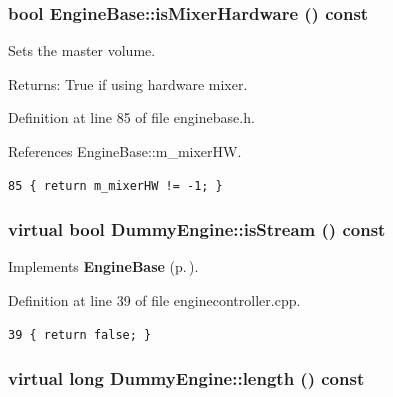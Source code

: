 \subsubsection{\setlength{\rightskip}{0pt plus 5cm}bool Engine\-Base::is\-Mixer\-Hardware () const\hspace{0.3cm}{\tt  [inline, inherited]}}\label{classEngineBase_EngineBasea11}


Sets the master volume. \begin{Desc}
\item[Returns:]True if using hardware mixer. \end{Desc}


Definition at line 85 of file enginebase.h.

References Engine\-Base::m\_\-mixer\-HW.



\footnotesize\begin{verbatim}85 { return m_mixerHW != -1; }
\end{verbatim}\normalsize 
{}
\subsubsection{\setlength{\rightskip}{0pt plus 5cm}virtual bool Dummy\-Engine::is\-Stream () const\hspace{0.3cm}{\tt  [inline, private, virtual]}}\label{classDummyEngine_DummyEngined6}




Implements {\bf Engine\-Base} {\rm (p.\,\pageref{classEngineBase_EngineBasea12})}.

Definition at line 39 of file enginecontroller.cpp.



\footnotesize\begin{verbatim}39 { return false; }
\end{verbatim}\normalsize 
{}
\subsubsection{\setlength{\rightskip}{0pt plus 5cm}virtual long Dummy\-Engine::length () const\hspace{0.3cm}{\tt  [inline, private, virtual]}}\label{classDummyEngine_DummyEngined3}




